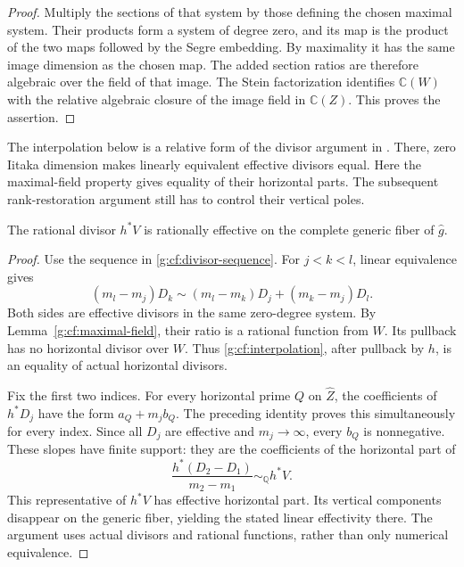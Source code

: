 \begin{proof}
Multiply the sections of that system by those defining
the chosen maximal system.  Their products form a
system of degree zero, and its map is the product of
the two maps followed by the Segre embedding.  By
maximality it has the same image dimension as the
chosen map.  The added section ratios are therefore
algebraic over the field of that image.  The Stein
factorization identifies $\mathbb C(W)$ with the
relative algebraic closure of the image field in
$\mathbb C(Z)$.  This proves the assertion.
\end{proof}

The interpolation below is a relative form of the divisor argument in
\cite[proof of Theorem~3.1, Step~3]{LP2018}. There, zero Iitaka
dimension makes linearly equivalent effective divisors equal. Here
the maximal-field property gives equality of their horizontal parts.
The subsequent rank-restoration argument still has to control their
vertical poles.

\begin{lemma}\label{g:cf:horizontal-slope}
The rational divisor $h^*V$ is rationally effective
on the complete generic fiber of $\widehat g$.
\end{lemma}

\begin{proof}
Use the sequence in \eqref{g:cf:divisor-sequence}.
For $j<k<l$, linear equivalence gives
\begin{equation}\label{g:cf:interpolation}
 (m_l-m_j)D_k
   \sim (m_l-m_k)D_j+(m_k-m_j)D_l.
\end{equation}
Both sides are effective divisors in the same
zero-degree system.  By Lemma~\ref{g:cf:maximal-field},
their ratio is a rational function from $W$.
Its pullback has no horizontal divisor over $W$.
Thus \eqref{g:cf:interpolation}, after pullback by
$h$, is an equality of actual horizontal divisors.

Fix the first two indices.  For every horizontal
prime $Q$ on $\widehat Z$, the coefficients of
$h^*D_j$ have the form $a_Q+m_jb_Q$.  The preceding
identity proves this simultaneously for every
index.  Since all $D_j$ are effective and
$m_j\to\infty$, every $b_Q$ is nonnegative.
These slopes have finite support: they are the
coefficients of the horizontal part of
\[
 \frac{h^*(D_2-D_1)}{m_2-m_1}
     \sim_{\mathbb Q}h^*V.
\]
This representative of $h^*V$ has effective
horizontal part.  Its vertical components disappear
on the generic fiber, yielding the stated linear
effectivity there.  The argument uses actual
divisors and rational functions, rather than only
numerical equivalence.
\end{proof}

